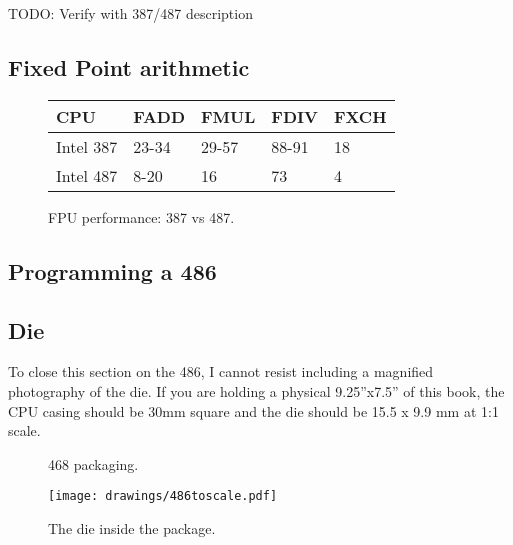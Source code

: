 TODO: Verify with 387/487 description

\subsection{Fixed Point arithmetic}

\par
\begin{figure}[H]
\centering
\begin{tabularx}{\textwidth}{ X  X X  X  X}
  \toprule
  \textbf{CPU} & \textbf{FADD} & \textbf{FMUL} & \textbf{FDIV} &\textbf{FXCH} \\ \bottomrule
Intel 387 & 23-34 & 29-57   & 88-91 & 18 \\
Intel 487 & 8-20  & 16   & 73 & 4 \\ \bottomrule
\end{tabularx}
\caption{FPU performance: 387 vs 487.}
\label{perf_summary}
\end{figure}

\subsection{Programming a 486}
\subsection{Die}
To close this section on the 486, I cannot resist including a magnified photography of the die. If you are holding a physical 9.25''x7.5'' of this book, the CPU casing should be 30mm square and the die should be 15.5 x 9.9 mm at 1:1 scale.\\
\par
\bigskip

  \begin{figure}[!htb]

\begin{minipage}{0.48\textwidth}
\centering
{}
\caption{468 packaging.}
\end{minipage}
\hfill
\begin{minipage}{0.48\textwidth}
\centering
\texttt{[image: drawings/486toscale.pdf]}
\caption{The die inside the package.}
\end{minipage}
\end{figure}

\par



\begin{figure}[H]
\centering
{}
\end{figure}
\par
\begin{figure}[H]
\centering
{}
\end{figure}
